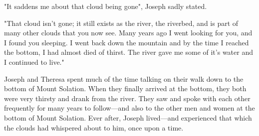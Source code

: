 "It saddens me about that cloud being gone", Joseph sadly stated.

"That cloud isn't gone; it still exists as the river, the riverbed, and is part of many other clouds that you now see. Many years ago I went looking for you, and I found you sleeping. I went back down the mountain and by the time I reached the bottom, I had almost died of thirst. The river gave me some of it's water and I continued to live."

Joseph and Theresa spent much of the time talking on their walk down to the bottom of Mount Solation. When they finally arrived at the bottom, they both were very thirsty and drank from the river. They saw and spoke with each other frequently for many years to follow—and also to the other men and women at the bottom of Mount Solation. Ever after, Joseph lived—and experienced that which the clouds had whispered about to him, once upon a time.